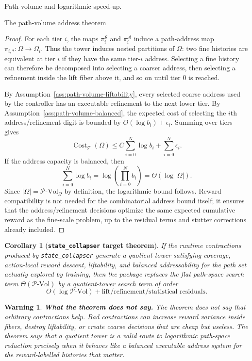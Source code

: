 \documentclass[11pt]{article}
\newtheorem{warning}[subsubsection]{Warning}
\newtheorem{corollary}[subsubsection]{Corollary}
\newcommand{\PVol}{\mathcal{P}\text{-}\mathrm{Vol}}
\newcommand{\cost}{\operatorname{Cost}}
\begin{document}
\begin{section}{Path-volume and logarithmic speed-up.}
\begin{subsection}{The path-volume address theorem}
\begin{proof}
For each tier $i$, the maps
$
\pi_i^{\mathcal S}
$
and
$
\pi_i^{\mathcal A}
$
induce a path-address map
$
\pi_{i,*}:\Omega\to\Omega_i.
$
Thus the tower induces nested partitions of $\Omega$: two fine histories are equivalent at tier $i$ if they have the same tier-$i$ address. Selecting a fine history can therefore be decomposed into selecting a coarser address, then selecting a refinement inside the lift fiber above it, and so on until tier $0$ is reached.

By Assumption~\ref{ass:path-volume-liftability}, every selected coarse address used by the controller has an executable refinement to the next lower tier. By Assumption~\ref{ass:path-volume-balanced}, the expected cost of selecting the $i$th address/refinement digit is bounded by
$
O(\log b_i)+\epsilon_i.
$
Summing over tiers gives
$$
\cost_{\mathcal{T}}(\Omega)
\le
C\sum_{i=0}^{N}\log b_i
+
\sum_{i=0}^{N}\epsilon_i.
$$
If the address capacity is balanced, then
$$
\sum_{i=0}^{N}\log b_i
=
\log\left(\prod_{i=0}^{N}b_i\right)
=
\Theta(\log|\Omega|).
$$
Since $|\Omega|=\PVol_{\Omega}$ by definition, the logarithmic bound follows. Reward compatibility is not needed for the combinatorial address bound itself; it ensures that the address/refinement decisions optimize the same expected cumulative reward as the fine-scale problem, up to the residual terms and stutter corrections already included.
\end{proof}

\begin{corollary}[{\bf \texttt{state\_collapser} target theorem}]\label{cor:state-collapser-path-volume}
If the runtime contractions produced by \texttt{state\_collapser} generate a quotient tower satisfying coverage, action-local reward descent, liftability, and balanced addressability for the path set actually explored by training, then the package replaces the flat path-space search term
$
\Theta(\PVol)
$
by a quotient-tower search term of order
$$
O(\log \PVol)
+
\text{lift/refinement/statistical residuals}.
$$
\end{corollary}

\begin{warning}
{\bf What the theorem does not say.}
\normalfont
The theorem does not say that arbitrary contractions help. Bad contractions can increase reward variance inside fibers, destroy liftability, or create coarse decisions that are cheap but useless. The theorem says that a quotient tower is a valid route to logarithmic path-space reduction precisely when it behaves like a balanced executable address system for the reward-labelled histories that matter.
\end{warning}


\end{subsection}
\end{section}
\end{document}
